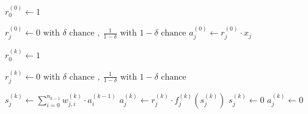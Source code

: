 \documentclass{article}
\begin{document}
          \begin{algorithm}
            \caption{%
              Modified version of algorithm \ref{algeval} with dropout
              regularization.
            } \label{algevaldrop}
            \begin{algorithmic}
                \State $r_0^{(0)} \gets 1$

                  \State $
                    r_j^{(0)} \gets
                      0 \text{ with } \delta \text{ chance },
                      \ \frac{1}{1-\delta} \text{ with } 1-\delta \text{ chance}
                  $
                  \State $a_j^{(0)} \gets r_j^{(0)} \cdot x_j$
                \EndFor

                  \State $r_0^{(k)} \gets 1$

                    \State $
                      r_j^{(k)} \gets
                        0 \text{ with } \delta \text{ chance },
                        \ \frac{1}{1-\delta} \text{ with } 1-\delta \text{ chance}
                    $

                      \State $
                        s_j^{(k)} \gets
                          \sum_{i=0}^{n_{k-1}} w_{j,i}^{(k)} \cdot a_i^{(k-1)}
                      $
                      \State $
                        a_j^{(k)} \gets r_j^{(k)} \cdot f_j^{(k)} \left( s_j^{(k)} \right)
                      $
                    \Else
                      \State $s_j^{(k)} \gets 0$
                      \State $a_j^{(k)} \gets 0$
                    \EndIf
                  \EndFor
                \EndFor
              \EndProcedure
            \end{algorithmic}
          \end{algorithm}
\end{document}
